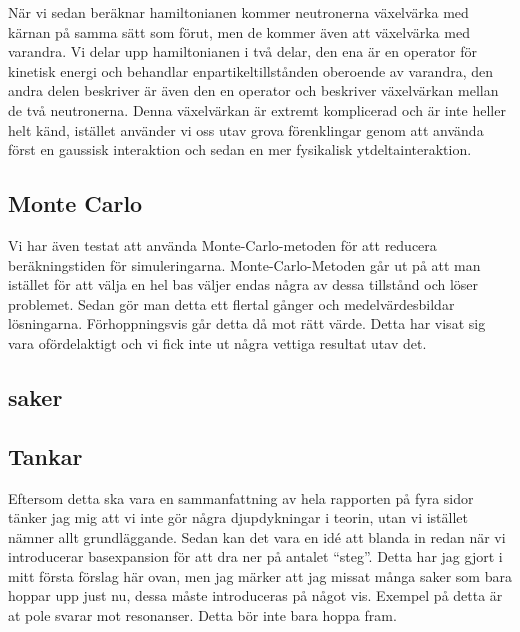 \documentclass[12pt,a4paper]{article}
\begin{document}
När vi sedan beräknar hamiltonianen kommer neutronerna växelvärka med kärnan på samma sätt som förut, men de kommer även att växelvärka med varandra.
Vi delar upp hamiltonianen i två delar, den ena är en operator för kinetisk energi och behandlar enpartikeltillstånden oberoende av varandra, den andra delen beskriver är även den en operator och beskriver växelvärkan mellan de två neutronerna.
Denna växelvärkan är extremt komplicerad och är inte heller helt känd, istället använder vi oss utav grova förenklingar genom att använda först en gaussisk interaktion och sedan en mer fysikalisk ytdeltainteraktion.



\subsection{Monte Carlo}
Vi har även testat att använda Monte-Carlo-metoden för att reducera beräkningstiden för simuleringarna.
Monte-Carlo-Metoden går ut på att man istället för att välja en hel bas väljer endas några av dessa tillstånd och löser problemet.
Sedan gör man detta ett flertal gånger och medelvärdesbildar lösningarna.
Förhoppningsvis går detta då mot rätt värde.
Detta har visat sig vara ofördelaktigt och vi fick inte ut några vettiga resultat utav det.

\subsection{saker}

\subsection{Tankar}
Eftersom detta ska vara en sammanfattning av hela rapporten på fyra sidor tänker jag mig att vi inte gör några djupdykningar i teorin, utan vi istället nämner allt grundläggande. Sedan kan det vara en idé att blanda in  redan när vi introducerar basexpansion för att dra ner på antalet ``steg''. Detta har jag gjort i mitt första förslag här ovan, men jag märker att jag missat många saker som bara hoppar upp just nu, dessa måste introduceras på något vis. Exempel på detta är at pole svarar mot resonanser. Detta bör inte bara hoppa fram.
\end{document}
